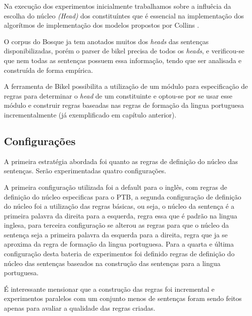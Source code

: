 
Na execução dos experimentos inicialmente trabalhamos sobre a influêcia da escolha do núcleo \emph{(Head)} dos constituíntes que é essencial na implementação dos algorítmos de implementação dos modelos propostos por Collins \cite{collins99}.

O corpus do Bosque ja tem anotados muitos dos \emph{heads} das sentenças disponibilizadas, porém o parser de bikel precisa de todos os \emph{heads}, e verificou-se que nem todas as sentenças possuem essa informação, tendo que ser analisada e construída de forma empírica.

A ferramenta de Bikel possibilita a utilização de um módulo para especificação de regras para determinar o \emph{head} de um constituinte e optou-se por se usar esse módulo e construir regras baseadas nas regras de formação da lingua portuguesa incrementalmente (já exemplificado em capítulo anterior). 

\subsection{Configurações}
\label{sec:configuracoes}

A primeira estratégia abordada foi quanto as regras de definição do núcleo das sentenças. Serão experimentadas quatro configurações.

A primeira configuração utilizada foi a default para o inglês, com regras de definição do núcleo especificas para o PTB, a segunda configuração de definição do núcleo foi a utilização das regras básicas, ou seja, o núcleo da sentença é a primeira palavra da direita para a esquerda, regra essa que é padrão na lingua inglesa, para terceira configuração se alterou as regras para que o núcleo da sentença seja a primeira palavra da esquerda para a direita, regra que ja se aproxima da regra de formação da lingua portuguesa. Para a quarta e última configuração desta bateria de experimentos foi definido regras de definição do núcleo das sentenças baseados na construção das sentenças para a lingua portuguesa.

É interessante mensionar que a construção das regras foi incremental e experimentos paralelos com um conjunto menos de sentenças foram sendo feitos apenas para avaliar a qualidade das regras criadas.

